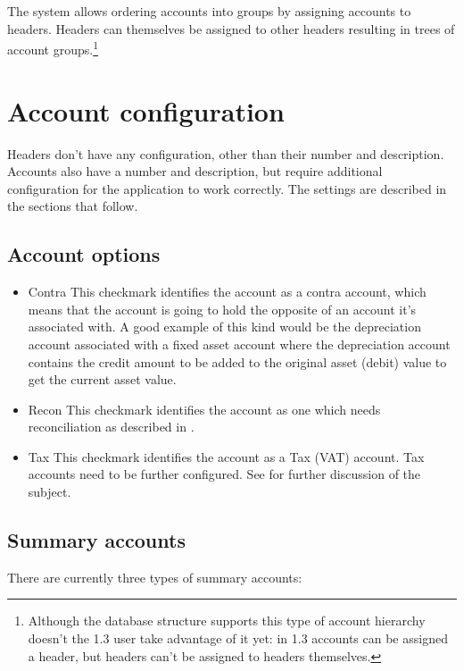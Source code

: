 The system allows ordering accounts into groups by assigning accounts to headers. Headers
can themselves be assigned to other headers resulting in trees of account groups.\footnote{Although the database structure supports this type of account hierarchy
doesn't the 1.3 user take advantage of it yet: in 1.3 accounts can be assigned a header,
but headers can't be assigned to headers themselves.}



\section{Account configuration}

Headers don't have any configuration, other than their number and description. Accounts also
have a number and description, but require additional configuration for the application to work
correctly. The settings are described in the sections that follow.

\subsection{Account options}
\label{sec:AccountOptions}
\begin{itemize}
\item Contra This checkmark identifies the account as a contra account, which means
   that the account is going to hold the opposite of an account it's associated with.
   A good example of this kind would be the depreciation account associated with a fixed
   asset account where the depreciation account contains the credit amount to be added to
   the original asset (debit) value to get the current asset value.
\item Recon This checkmark identifies the account as one which needs reconciliation as
   described in .
\item Tax This checkmark identifies the account as a Tax (VAT) account. Tax accounts need
   to be further configured. See  for further discussion of the
   subject.
   \label{item:AccountOptionsTax}
\end{itemize}

\subsection{Summary accounts}
\label{subsec:summary-accounts}

There are currently three types of summary accounts:

